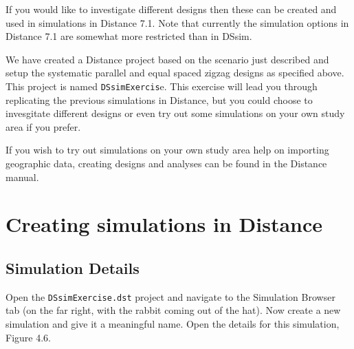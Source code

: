 \documentclass[]{book}
\theoremstyle{definition}
\theoremstyle{definition}
\theoremstyle{remark}
\begin{document}
If you would like to investigate different designs then these can be
created and used in simulations in Distance 7.1. Note that currently the
simulation options in Distance 7.1 are somewhat more restricted than in
DSsim.

We have created a Distance project based on the scenario just described
and setup the systematic parallel and equal spaced zigzag designs as
specified above. This project is named \texttt{DSsimExercis}e. This
exercise will lead you through replicating the previous simulations in
Distance, but you could choose to invesgitate different designs or even
try out some simulations on your own study area if you prefer.

If you wish to try out simulations on your own study area help on
importing geographic data, creating designs and analyses can be found in
the Distance manual.

\section{Creating simulations in
Distance}\label{creating-simulations-in-distance}

\subsection{Simulation Details}\label{simulation-details}

Open the \texttt{DSsimExercise.dst} project and navigate to the
Simulation Browser tab (on the far right, with the rabbit coming out of
the hat). Now create a new simulation and give it a meaningful name.
Open the details for this simulation, Figure 4.6.
\end{document}
